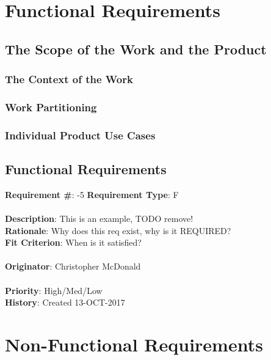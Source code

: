 \documentclass[11pt]{article}
\begin{document}
\section{Functional Requirements}

\subsection{The Scope of the Work and the Product}

\subsubsection{The Context of the Work}
\subsubsection{Work Partitioning}
\subsubsection{Individual Product Use Cases}

\subsection{Functional Requirements}

\begin{framed}
	\noindent\textbf{Requirement \#}: -5 \hfill \textbf{Requirement Type}: F \hfill\\\\
	\noindent\textbf{Description}: This is an example, TODO remove!  \\
	\textbf{Rationale}: Why does this req exist, why is it REQUIRED? \\
	\textbf{Fit Criterion}: When is it satisfied? \\\\
	\textbf{Originator}: Christopher McDonald \\\\
	\textbf{Priority}: High/Med/Low \hfill \\
	\noindent\textbf{History}: Created 13-OCT-2017
\end{framed}


\section{Non-Functional Requirements}
\end{document}
